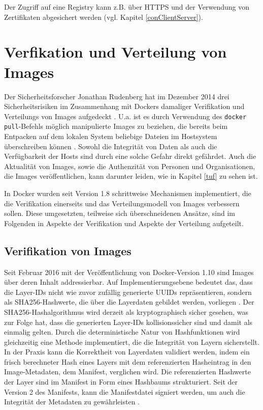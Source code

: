 \documentclass[../main.tex]{subfiles}
\begin{document}
    Der Zugriff auf eine Registry kann z.B. über \acrshort{HTTPS} und der Verwendung von Zertifikaten abgesichert werden \cite{dockerRegistry} (vgl. Kapitel \ref{conClientServer}).

  \section{Verfikation und Verteilung von Images}
    Der Sicherheitsforscher Jonathan Rudenberg hat im Dezember 2014 drei Sicherheitsrisiken im Zusammenhang mit Dockers damaliger Verifikation und Verteilungs von Images aufgedeckt \cite{githubRegistryV1Issues}\cite{registryV1IssuesRudenberg}. U.a. ist es durch Verwendung des \texttt{docker pull}-Befehls möglich manipulierte Images zu beziehen, die bereits beim Entpacken auf dem lokalen System beliebige Dateien im Hostsystem überschreiben können \cite{registryV1IssuesRedHat}. Sowohl die Integrität von Daten als auch die Verfügbarkeit der Hosts sind durch eine solche Gefahr direkt gefährdet. Auch die Aktualität von Images, sowie die Authenzität von Personen und Organisationen, die Images veröffentlichen, kann darunter leiden, wie in Kapitel \ref{tuf} zu sehen ist.

    In Docker wurden seit Version 1.8 schrittweise Mechanismen implementiert, die die Verifikation einerseits und das Verteilungsmodell von Images verbessern sollen. Diese umgesetzten, teilweise sich überschneidenen Ansätze, sind im Folgenden in Aspekte der Verifikation und Aspekte der Verteilung aufgeteilt.

    \subsection{Verifikation von Images}
      Seit Februar 2016 mit der Veröffentlichung von Docker-Version 1.10 sind Images über deren Inhalt addressierbar. Auf Implementierungsebene bedeutet das, dass die Layer-IDs nicht wie zuvor zufällig generierte UUIDs repräsentieren, sondern als SHA256-Hashwerte, die über die Layerdaten gebildet werden, vorliegen \cite[S.16]{http://www.slideshare.net/Docker/docker-48351569}. Der SHA256-Hashalgorithmus wird derzeit als kryptographisch sicher gesehen, was zur Folge hat, dass die generierten Layer-IDs kollisionssicher sind und damit als einmalig gelten. Durch die deterministische Natur von Hashfunktionen wird gleichzeitig eine Methode implementiert, die die Integrität von Layern sicherstellt. In der Praxis kann die Korrektheit von Layerdaten validiert werden, indem ein frisch berechneter Hash eines Layers mit dem referenzierten Hasheintrag in den Image-Metadaten, dem Manifest, verglichen wird. Die referenzierten Hashwerte der Layer sind im Manifest in Form eines Hashbaums strukturiert. Seit der Version 2 des Manifests, kann die Manifestdatei signiert werden, um auch die Integrität der Metadaten zu gewährleisten \cite{https://github.com/docker/distribution/blob/master/docs/spec/manifest-v2-1.md}.
\end{document}
